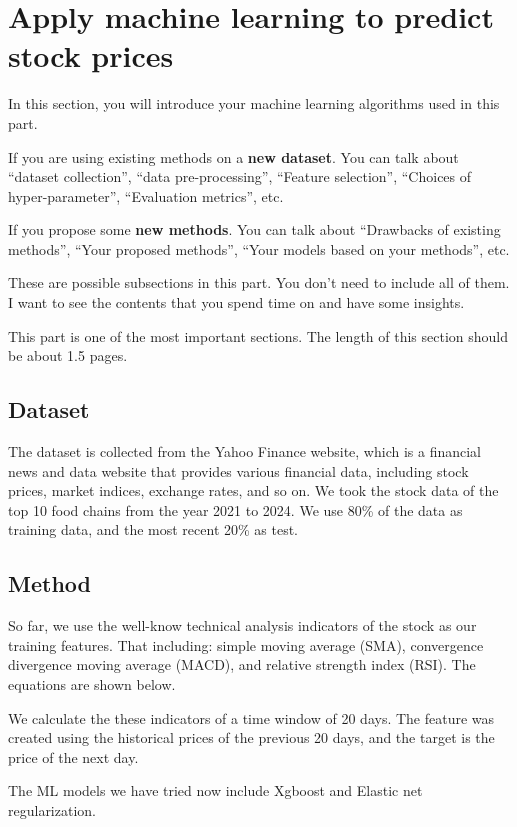 \documentclass[11pt]{article}
\begin{document}
\section{Apply machine learning to predict stock prices}

In this section, you will introduce your machine learning
algorithms used in this part.

If you are using existing methods on a \textbf{new dataset}. You
can talk about ``dataset collection'', ``data pre-processing'',
``Feature selection'', ``Choices of hyper-parameter'',
``Evaluation metrics'', etc.

If you propose some \textbf{new methods}. You can talk about
``Drawbacks of existing methods'', ``Your proposed methods'',
``Your models based on your methods'', etc.

These are possible subsections in this part. You don't need to
include all of them. I want to see the contents that you spend
time on and have some insights.

This part is one of the most important sections. The length of this
section should be about 1.5 pages.

\subsection{Dataset}
The dataset is collected from the Yahoo Finance website, which is a financial news and data website that provides various financial data,
including stock prices, market indices, exchange rates, and so on. 
We took the stock data of the top 10 food chains from the year 2021 to 2024. 
We use 80\% of the data as training data, and the most recent 20\% as test.

\subsection{Method}

So far, we use the well-know technical analysis indicators of the stock as our training features.
That  including: simple moving average (SMA),
convergence divergence moving average (MACD), and relative
strength index (RSI). The equations are shown below.

We calculate the these indicators of a time window of 20 days. The feature was created using the historical prices of the previous 
20 days, and the target is the price of the next day.

The ML models we have tried now include Xgboost and Elastic net regularization.
\end{document}
